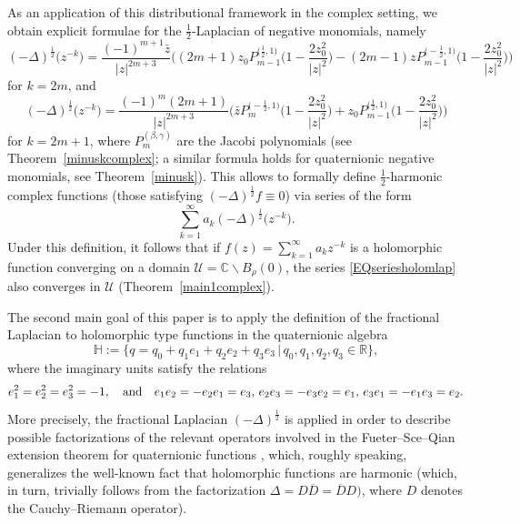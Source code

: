 \documentclass[reqno,11pt]{amsart}
\theoremstyle{definition}
\begin{document}
As an application of this distributional framework in the complex setting, we obtain explicit formulae for the $\frac{1}{2}$-Laplacian of  negative monomials, namely
\[
	(-\Delta)^\frac{1}{2}\big(z^{-k}\big)=\frac{ (-1)^{m+1}\bar{z}}{|z|^{2m+3}}\bigg((2m+1)z_0P_{m-1}^{\big(\frac{1}{2},1\big)}\bigg(1-\frac{2z_0^2}{|z|^2}\bigg)-(2m-1)zP_{m-1}^{\big(-\frac{1}{2},1\big)}\bigg(1-\frac{2z_0^2}{|z|^2}\bigg)\bigg)
\]
for $k=2m$, and
\[
	(-\Delta)^\frac{1}{2}\big(z^{-k}\big)= \frac{(-1)^m (2m+1)}{|z|^{2m+3}}\bigg(\bar{z}P_{m}^{\big(-\frac{1}{2},1\big)}\bigg(1-\frac{2z_0^2}{|z|^2}\bigg)+z_0P_{m-1}^{\big(\frac{1}{2},1\big)}\bigg(1-\frac{2z_0^2}{|z|^2}\bigg)\bigg)
\]
for $k=2m+1$, where $P_m^{(\beta,\gamma)}$ are the Jacobi polynomials  \cite{AS,STW,S39} (see Theorem~\ref{minuskcomplex}; a similar formula holds for quaternionic negative monomials, see Theorem~\ref{minusk}). This allows to formally define $\frac{1}{2}$-harmonic complex functions (those satisfying $(-\Delta)^\frac{1}{2}f\equiv 0$) via series of the form
\begin{equation}
	\label{EQseriesholomlap}
\sum_{k=1}^\infty a_k (-\Delta)^\frac{1}{2}\big(z^{-k}\big).
\end{equation}
Under this definition, it follows that  if $f(z)=\sum_{k=1}^\infty a_kz^{-k}$ is a holomorphic function converging on a domain $\mathcal{U}=\mathbb{C}\backslash B_\rho(0)$, the series \eqref{EQseriesholomlap} also converges in $\mathcal{U}$ (Theorem~\ref{main1complex}).








\medskip

The second main goal of this paper is to apply the definition of the fractional Laplacian  to holomorphic type functions in the quaternionic algebra
\[
\mathbb{H}:= \{q=q_0+q_1e_1+q_2e_2+q_3e_3 \,| \, q_0, q_1, q_2, q_3 \in \mathbb{R}\},
\]
where the imaginary units satisfy the relations
\[
e_1^2=e_2^2=e_3^2=-1, \quad \hbox{and} \quad e_1e_2=-e_2e_1=e_3, \, e_2e_3=-e_3e_2=e_1, \, e_3e_1=-e_1e_3=e_2.
\]
More precisely, the fractional Laplacian $(-\Delta)^\frac{1}{2}$ is applied in order to describe possible factorizations of the relevant operators involved in the Fueter--Sce--Qian extension theorem for quaternionic functions \cite{ColSabStrupSce, Q, Q1}, which, roughly speaking, generalizes the well-known fact that holomorphic functions are harmonic (which, in turn, trivially follows from the factorization $\Delta= D\overline{D}=\overline{D}D)$, where $D$ denotes the Cauchy--Riemann operator).
\end{document}
